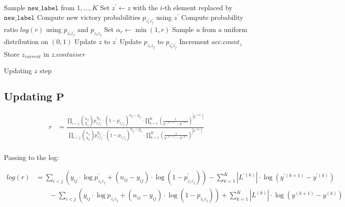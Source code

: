 \documentclass[11pt]{amsart}
\begin{document}
\begin{algorithm}
\begin{algorithmic}[1]
\State Sample $\texttt{new\_label}$ from $1,...,K$
\State Set $z^{\prime} \gets z$ with the $i$-th element replaced by $\texttt{new\_label}$
\State Compute new victory probabilities $p_{z^{\prime}_i z^{\prime}_j}$ using $z^{\prime}$
\State Compute probability ratio $log(r)$  using $p_{z^{\prime}_i z^{\prime}_j}$ and $p_{z_i z_j}$
\State Set $\alpha_{r} \gets \min(1, r)$
\State Sample $u$ from a uniform distribution on $(0,1)$
\State Update $z$ to $z^{\prime}$
\State Update $p_{z_iz_j}$ to $p_{z^{\prime}_i z^{\prime}_j}$
\State Increment $acc.count_{z}$
\EndIf
\State Store $z_{current}$ in $z.container$
\EndFor
\end{algorithmic}
\caption{Updating $z$ step}
\end{algorithm}


\subsection{Updating $\mathbf{P}$}



\begin{align}
r &= \frac{\prod_{i<j}\binom{n_{ij}}{y_{ij}}p_{z_i z_j}^{\prime y_{ij}} \cdot (1 - p^{\prime}_{z_i z_j})^{n_{ij} - y_{ij}} \cdot \prod_{k=1}^K  \left( \frac{1}{y^{\prime (k+1)} - y^{\prime(k)}}\right)^{|L^{\prime(k)}|}}{\prod_{i<j}\binom{n_{ij}}{y_{ij}}p_{z_i z_j}^{y_{ij}} \cdot (1 - p_{z_i z_j})^{n_{ij} - y_{ij}} \cdot \prod_{k=1}^K  \left( \frac{1}{y^{(k+1)} - y^{(k)}}\right)^{|L^{(k)}|}} \\
\end{align}


Passing to the log:

\begin{align}
log(r) &= \sum_{i<j} \left(  y_{ij} \cdot \log{ p^{\prime}_{z_i z_j} } + (n_{ij} - y_{ij}) \cdot \log{ (1 - p^{\prime}_{z_i z_j}) } \right)  - \sum_{k=1}^K |L^{\prime(k)}| \cdot \log{\left( y^{\prime(k+1)} - y^{\prime(k)} \right)}\\
 &\qquad - \sum_{i<j} \left(  y_{ij} \cdot \log{ p_{z_i z_j} } + (n_{ij} - y_{ij}) \cdot \log{ (1 - p_{z_i z_j}) } \right)  + \sum_{k=1}^K |L^{(k)}| \cdot \log{\left( y^{(k+1)} - y^{(k)} \right) }
\end{align}
\end{document}
